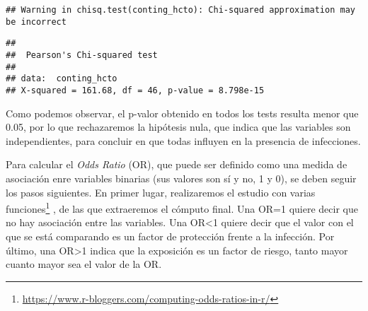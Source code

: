\documentclass[]{article}
\let\rmarkdownfootnote\footnote%
\def\footnote{\protect\rmarkdownfootnote}
\begin{document}
\begin{verbatim}
## Warning in chisq.test(conting_hcto): Chi-squared approximation may be incorrect
\end{verbatim}

\begin{verbatim}
## 
##  Pearson's Chi-squared test
## 
## data:  conting_hcto
## X-squared = 161.68, df = 46, p-value = 8.798e-15
\end{verbatim}

Como podemos observar, el p-valor obtenido en todos los tests resulta
menor que 0.05, por lo que rechazaremos la hipótesis nula, que indica
que las variables son independientes, para concluir en que todas
influyen en la presencia de infecciones.

Para calcular el \emph{Odds Ratio} (OR), que puede ser definido como una
medida de asociación enre variables binarias (sus valores son sí y no, 1
y 0), se deben seguir los pasos siguientes. En primer lugar,
realizaremos el estudio con varias funciones\footnote{\url{https://www.r-bloggers.com/computing-odds-ratios-in-r/}}
, de las que extraeremos el cómputo final. Una OR=1 quiere decir que no
hay asociación entre las variables. Una OR\textless{}1 quiere decir que
el valor con el que se está comparando es un factor de protección frente
a la infección. Por último, una OR\textgreater{}1 indica que la
exposición es un factor de riesgo, tanto mayor cuanto mayor sea el valor
de la OR.
\end{document}
